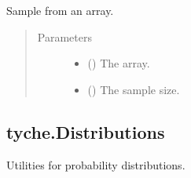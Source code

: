 \documentclass[letterpaper,10pt,english]{sphinxmanual}
\begin{document}
\begin{fulllineitems}
\label{\detokenize{tyche:tyche.Designs.sampler}}
Sample from an array.
\begin{quote}\begin{description}
\item[{Parameters}] \leavevmode\begin{itemize}
\item {} 
 () \textendash{} The array.

\item {} 
 () \textendash{} The sample size.

\end{itemize}

\end{description}\end{quote}

\end{fulllineitems}



\subsection{tyche.Distributions}
\label{\detokenize{tyche:module-tyche.Distributions}}\label{\detokenize{tyche:tyche-distributions}}
Utilities for probability distributions.
\end{document}

